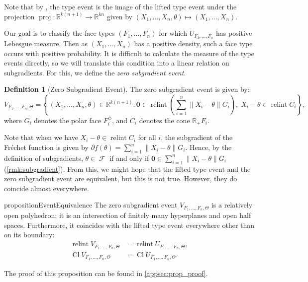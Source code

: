 \documentclass[10pt]{article}
\theoremstyle{definition}
\newtheorem{definition}[theorem]{Definition}
\theoremstyle{remark}
\newcommand{\R}{\mathbb{R}}
\newcommand{\CType}{F_1,\dots,F_n}
\newcommand{\sample}{ X_1,\dots, X_n}
\DeclareMathOperator{\relint}{relint}
\DeclareMathOperator{\closure}{Cl}
\DeclareMathOperator{\FMset}{\mathcal{F}}
\DeclareMathOperator{\proj}{proj}
\renewcommand{\vec}[1]{\mathbf{#1}}
\begin{document}
	Note that by , the type event is the image of the lifted type event under the projection $\proj: \R^{k(n+1)} \rightarrow \R^{kn}$ given by $(\sample, \theta) \mapsto (\sample)$.
	
	Our goal is to classify the face types $(\CType)$ for which $U_{\CType}$ has positive Lebesgue measure. Then as $(\sample)$ has a positive density, such a face type occurs with positive probability. It is difficult to calculate the measure of the type events directly, so we will translate this condition into a linear relation on subgradients. For this, we define the \emph{zero subgradient event}.
	
	\begin{definition}[Zero Subgradient Event]
		The zero subgradient event is given by:
		\[
		V_{\CType, \Theta} = \left\{ (\sample, \theta) \in \R^{k(n+1)} : \vec 0 \in \relint \left( \textstyle \sum_{i=1}^n \|X_i-\theta\| G_i \right),\; X_i - \theta \in \relint C_i \right\},
		\]
		where $G_i$ denotes the polar face $F_i^{\Diamond}$, and $C_i$ denotes the cone $\R_+F_i$.
	\end{definition}
	
	Note that when we have $X_i - \theta \in \relint C_i$ for all $i$, the subgradient of the Fr\'echet function is given by $\partial f(\theta) = \sum_{i=1}^n \| X_i - \theta \|G_i$. Hence, by the definition of subgradients, $\theta \in \FMset$ if and only if $\vec 0 \in \sum_{i=1}^n \| X_i - \theta \|G_i$ (\cref{rmk:subgradient}). From this, we might hope that the lifted type event and the zero subgradient event are equivalent, but this is not true. However, they do coincide almost everywhere.
	
	\begin{restatable}{proposition}{EventEquivalence}\label{prop:lifted_type_event}
		The zero subgradient event $V_{\CType, \Theta}$ is a relatively open polyhedron; it is an intersection of finitely many hyperplanes and open half spaces. Furthermore, it coincides with the lifted type event everywhere other than on its boundary:
		\begin{align*}
			\relint V_{\CType, \Theta} &= \relint U_{\CType, \Theta},\\
			\closure V_{\CType, \Theta} &= \closure U_{\CType, \Theta}.
		\end{align*}
	\end{restatable}
	
	The proof of this proposition can be found in \cref{appsec:prop_proof}.
	
\end{document}
